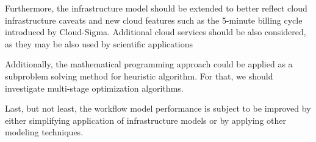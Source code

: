Furthermore, the infrastructure model should be extended to better reflect cloud infrastructure caveats and new cloud features such as the 5-minute billing cycle introduced by Cloud-Sigma. Additional cloud services should be also considered, as they may be also used by scientific applications

Additionally, the mathematical programming approach could be applied as a subproblem solving method for heuristic algorithm. For that, we should investigate multi-stage optimization algorithms.

Last, but not least, the workflow model performance is subject to be improved by either simplifying application of infrastructure models or by applying other modeling techniques.

